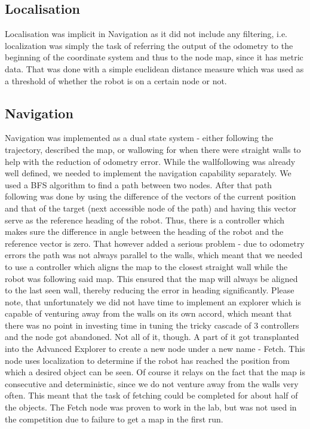 \subsection{Localisation}
Localisation was implicit in Navigation as it did not include any filtering, i.e. localization was simply the task of referring the output of the odometry to the beginning of the coordinate system and thus to the node map, since it has metric data. That was done with a simple euclidean distance measure which was used as a threshold of whether the robot is on a certain node or not. 
\subsection{Navigation}
Navigation was implemented as a dual state system - either following the trajectory, described the map, or wallowing for when there were straight walls to help with the reduction of odometry error. While the wallfollowing was already well defined, we needed to implement the navigation capability separately. We used a BFS algorithm to find a path between two nodes. After that path following was done by using the difference of the vectors of the current position and that of the target (next accessible node of the path) and having this vector serve as the reference heading of the robot. Thus, there is a controller which makes sure the difference in angle between the heading of the robot and the reference vector is zero. That however added a serious problem - due to odometry errors the path was not always parallel to the walls, which meant that we needed to use a controller which aligns the map to the closest straight wall while the robot was following said map. This ensured that the map will always be aligned to the last seen wall, thereby reducing the error in heading significantly. Please note, that unfortunately we did not have time to implement an explorer which is capable of venturing away from the walls on its own accord, which meant that there was no point in investing time in tuning the tricky cascade of 3 controllers and the node got abandoned. 
Not all of it, though. A part of it got transplanted into the Advanced Explorer to create a new node under a new name - Fetch. This node uses localization to determine if the robot has reached the position from which a desired object can be seen. Of course it relays on the fact that the map is consecutive and deterministic, since we do not venture away from the walls very often. This meant that the task of fetching could be completed for about half of the objects. The Fetch node was proven to work in the lab, but was not used in the competition due to failure to get a map in the first run.   


